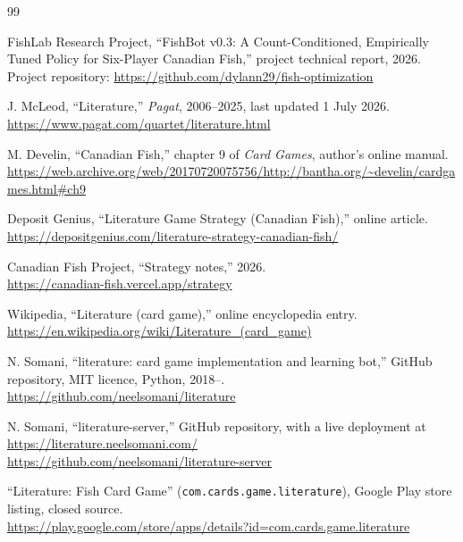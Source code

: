 \documentclass[11pt]{article}
\theoremstyle{definition}
\begin{document}
\begin{thebibliography}{99}


FishLab Research Project, ``FishBot v0.3: A Count-Conditioned, Empirically Tuned
Policy for Six-Player Canadian Fish,'' project technical report, 2026. Project
repository: \url{https://github.com/dylann29/fish-optimization}

J. McLeod, ``Literature,'' \emph{Pagat}, 2006--2025, last updated 1 July 2026.\\
\url{https://www.pagat.com/quartet/literature.html}

M. Develin, ``Canadian Fish,'' chapter 9 of \emph{Card Games}, author's online
manual.\\
\url{https://web.archive.org/web/20170720075756/http://bantha.org/~develin/cardgames.html\#ch9}

Deposit Genius, ``Literature Game Strategy (Canadian Fish),'' online article.\\
\url{https://depositgenius.com/literature-strategy-canadian-fish/}

Canadian Fish Project, ``Strategy notes,'' 2026.\\
\url{https://canadian-fish.vercel.app/strategy}

Wikipedia, ``Literature (card game),'' online encyclopedia entry.\\
\url{https://en.wikipedia.org/wiki/Literature_(card_game)}

N. Somani, ``literature: card game implementation and learning bot,'' GitHub
repository, MIT licence, Python, 2018--.\\
\url{https://github.com/neelsomani/literature}

N. Somani, ``literature-server,'' GitHub repository, with a live deployment at
\url{https://literature.neelsomani.com/}\\
\url{https://github.com/neelsomani/literature-server}

``Literature: Fish Card Game'' (\texttt{com.cards.game.literature}), Google Play
store listing, closed source.\\
\url{https://play.google.com/store/apps/details?id=com.cards.game.literature}


\end{thebibliography}
\end{document}
